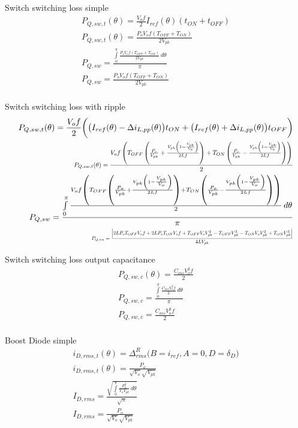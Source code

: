 \documentclass[12pt]{report}
\begin{document}
Switch switching loss simple
\begin{align}
P_{Q,sw,t}(\theta) = \frac{V_{o}f}{2}I_{ref}(\theta)(t_{ON} + t_{OFF})\\
P_{Q,sw,t}(\theta) = \frac{P_{o} V_{o} f \left(T_{OFF} + T_{ON}\right)}{2 V_{pk}}\\
P_{Q,sw} = \frac{\int\limits_{0}^{\pi} \frac{P_{o} V_{o} f \left(T_{OFF} + T_{ON}\right)}{2 V_{pk}}\, d\theta}{\pi}\\
P_{Q,sw} = \frac{P_{o} V_{o} f \left(T_{OFF} + T_{ON}\right)}{2 V_{pk}}\\
\end{align}

Switch switching loss with ripple
\begin{align}
P_{Q,sw,t}(\theta) = \frac{V_{o}f}{2}\bigg(\big(I_{ref}(\theta)-\Delta i_{L,pp}(\theta)\big)t_{ON} + \big(I_{ref}(\theta)+\Delta i_{L,pp}(\theta)\big)t_{OFF}\bigg)\\
\text{\scalebox{0.75}{$P_{Q,sw,t}(\theta) = \frac{V_{o} f \left(T_{OFF} \left(\frac{P_{o}}{V_{pk}} + \frac{V_{pk} \left(1 - \frac{V_{pk}}{V_{o}}\right)}{2 L f}\right) + T_{ON} \left(\frac{P_{o}}{V_{pk}} - \frac{V_{pk} \left(1 - \frac{V_{pk}}{V_{o}}\right)}{2 L f}\right)\right)}{2}$}}\\
P_{Q,sw} = \frac{\int\limits_{0}^{\pi} \frac{V_{o} f \left(T_{OFF} \left(\frac{P_{o}}{V_{pk}} + \frac{V_{pk} \left(1 - \frac{V_{pk}}{V_{o}}\right)}{2 L f}\right) + T_{ON} \left(\frac{P_{o}}{V_{pk}} - \frac{V_{pk} \left(1 - \frac{V_{pk}}{V_{o}}\right)}{2 L f}\right)\right)}{2}\, d\theta}{\pi}\\
\text{\scalebox{0.6}{$P_{Q,sw} = \frac{\left|{2 L P_{o} T_{OFF} V_{o} f + 2 L P_{o} T_{ON} V_{o} f + T_{OFF} V_{o} V_{pk}^{2} - T_{OFF} V_{pk}^{3} - T_{ON} V_{o} V_{pk}^{2} + T_{ON} V_{pk}^{3}}\right|}{4 L V_{pk}}$}}\\
\end{align}

Switch switching loss output capacitance
\begin{align}
P_{Q,sw,c}(\theta) = \frac{C_{oss} V_{o}^{2} f}{2}\\
P_{Q,sw,c} = \frac{\int\limits_{0}^{\pi} \frac{C_{oss} V_{o}^{2} f}{2}\, d\theta}{\pi}\\
P_{Q,sw,c} = \frac{C_{oss} V_{o}^{2} f}{2}\\
\end{align}

Boost Diode simple
\begin{align}
i_{D,rms,t}(\theta) = \Delta^R_{rms} \big(B=i_{ref}, A=0, D=\delta_{D} \big)\\
i_{D,rms,t}(\theta) = \frac{P_{o}}{\sqrt{V_{o}} \sqrt{V_{pk}}}\\
I_{D,rms} = \frac{\sqrt{\int\limits_{0}^{\pi} \frac{P_{o}^{2}}{V_{o} V_{pk}}\, d\theta}}{\sqrt{\pi}}\\
I_{D,rms} = \frac{P_{o}}{\sqrt{V_{o}} \sqrt{V_{pk}}}\\
\end{align}
\end{document}
